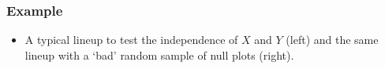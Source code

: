 \documentclass{beamer}
\begin{document}
\begin{frame}
\frametitle{Example}
\begin{itemize}
\item A typical lineup to test the independence of $X$ and $Y$ (left) and the same lineup with a `bad' random sample of null plots (right).
\end{itemize}
\begin{columns}
		\begin{column}{0.52\textwidth}
		\begin{figure}
			 \begin{center}  
			 \end{center}
			 \end{figure}
		\end{column}
		

\end{columns}
\end{frame}
\end{document}
